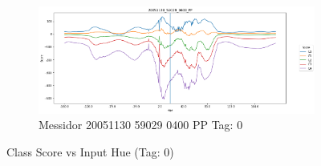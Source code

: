 \begin{figure}[ht!]
\begin{subfigure}[b]{ 0.85\textwidth}
		\centering
		\includegraphics[width=\textwidth]{Figures/chapter_stability/20051130_59029_0400_PP/h/scores.png}
		\caption{Messidor 20051130 59029 0400 PP Tag: 0}		
	\end{subfigure}
	\hfill 
	\caption[Score vs Hue (Tag: 0)]{Class Score vs Input Hue (Tag: 0)}  
	\label{sta:fig:hue0} 
\end{figure}

